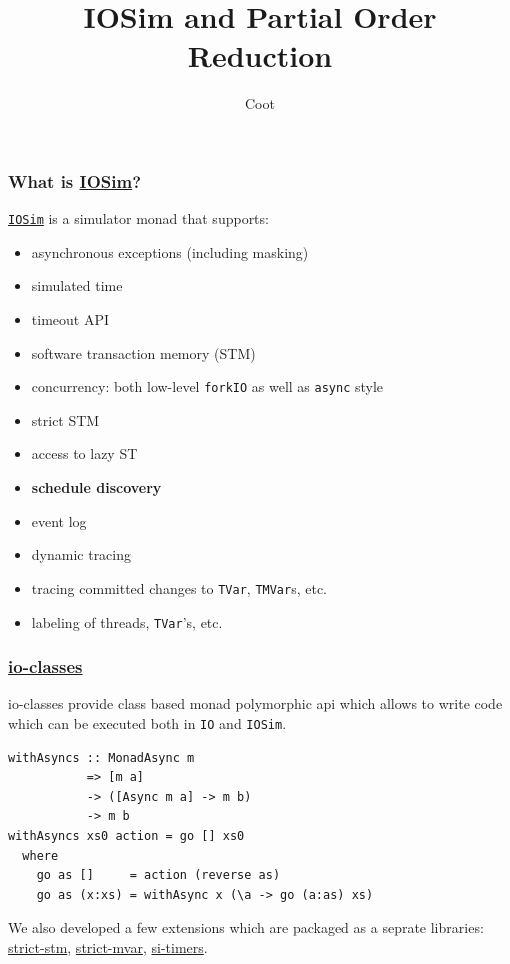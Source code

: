 \documentclass[t,x11names,xcolor={x11names},hyperref={colorlinks,citecolor=Blue4,linkcolor=Blue4,anchorcolor=Blue4,urlcolor=Blue4}]{beamer}
\author{Coot}
\title{IOSim and Partial Order Reduction\\[5pt]}
\begin{document}
\begin{frame}
    \titlepage
\end{frame}

\begin{frame}
  \frametitle{What is \href{https://hackage.haskell.org/package/io-sim}{IOSim}?}
  \href{https://hackage.haskell.org/package/io-sim}{\texttt{IOSim}} is a simulator monad that supports:
  \begin{itemize}
    \item asynchronous exceptions (including masking)
    \item simulated time
    \item timeout API
    \item software transaction memory (STM)
    \item concurrency: both low-level \texttt{forkIO} as well as \texttt{async} style
    \item strict STM
    \item access to lazy ST
    \item \textbf{schedule discovery}
    \item event log
    \item dynamic tracing
    \item tracing committed changes to \texttt{TVar}, \texttt{TMVar}s, etc.
    \item labeling of threads, \texttt{TVar}'s, etc.
  \end{itemize}
\end{frame}

\begin{frame}[fragile]
  \frametitle{\href{https://hackage.haskell.org/package/io-clases}{io-classes}}
  io-classes provide class based monad polymorphic api which allows to write
  code which can be executed both in \texttt{IO} and \texttt{IOSim}.\\

  \begin{verbatim}
withAsyncs :: MonadAsync m
           => [m a]
           -> ([Async m a] -> m b)
           -> m b
withAsyncs xs0 action = go [] xs0
  where
    go as []     = action (reverse as)
    go as (x:xs) = withAsync x (\a -> go (a:as) xs)
  \end{verbatim}

  \vspace{1em}
  We also developed a few extensions which are packaged as a seprate libraries:
  \href{https://hackage.haskell.org/package/strict-stm}{strict-stm},
  \href{https://hackage.haskell.org/package/strict-mvar}{strict-mvar},
  \href{https://hackage.haskell.org/package/si-timers}{si-timers}.
\end{frame}
\end{document}
